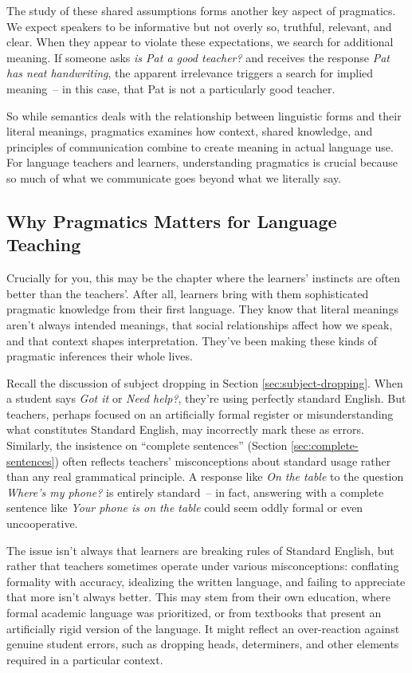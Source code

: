 The study of these shared assumptions forms another key aspect of pragmatics. We expect speakers to be informative but not overly so, truthful, relevant, and clear. When they appear to violate these expectations, we search for additional meaning. If someone asks \textit{is Pat a good teacher?} and receives the response \textit{Pat has neat handwriting}, the apparent irrelevance triggers a search for implied meaning~-- in this case, that Pat is not a particularly good teacher.

So while semantics deals with the relationship between linguistic forms and their literal meanings, pragmatics examines how context, shared knowledge, and principles of communication combine to create meaning in actual language use. For language teachers and learners, understanding pragmatics is crucial because so much of what we communicate goes beyond what we literally say.

\subsection{Why Pragmatics Matters for Language Teaching}


Crucially for you, this may be the chapter where the learners' instincts are often better than the teachers'. After all, learners bring with them sophisticated pragmatic knowledge from their first language. They know that literal meanings aren't always intended meanings, that social relationships affect how we speak, and that context shapes interpretation. They've been making these kinds of pragmatic inferences their whole lives.

Recall the discussion of subject dropping in Section \ref{sec:subject-dropping}. When a student says \textit{Got it} or \textit{Need help?}, they're using perfectly standard English. But teachers, perhaps focused on an artificially formal register or misunderstanding what constitutes Standard English, may incorrectly mark these as errors. Similarly, the insistence on ``complete sentences'' (Section \ref{sec:complete-sentences}) often reflects teachers' misconceptions about standard usage rather than any real grammatical principle. A response like \textit{On the table} to the question \textit{Where's my phone?} is entirely standard~-- in fact, answering with a complete sentence like \textit{Your phone is on the table} could seem oddly formal or even uncooperative.

The issue isn't always that learners are breaking rules of Standard English, but rather that teachers sometimes operate under various misconceptions: conflating formality with accuracy, idealizing the written language, and failing to appreciate that more isn't always better. This may stem from their own education, where formal academic language was prioritized, or from textbooks that present an artificially rigid version of the language. It might reflect an over-reaction against genuine student errors, such as dropping heads, determiners, and other elements required in a particular context.

